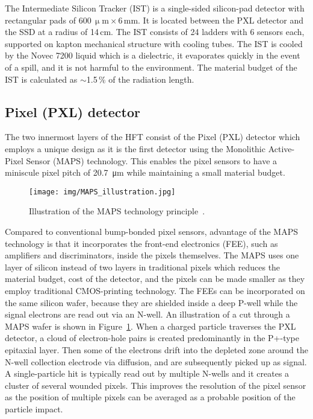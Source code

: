 The Intermediate Silicon Tracker (IST) is a single-sided silicon-pad detector with rectangular pads of $600\,\upmu\mathrm{m}\times6\,$mm. It is located between the PXL detector and the SSD at a radius of 14$\,$cm. The IST consists of 24 ladders with 6 sensors each, supported on kapton mechanical structure with cooling tubes. The IST is cooled by the Novec 7200 liquid which is a dielectric, it evaporates quickly in the event of a spill, and it is not harmful to the environment. The material budget of the IST is calculated as $\sim$1.5$\,\%$ of the radiation length.

\subsection{Pixel (PXL) detector}
The two innermost layers of the HFT consist of the Pixel (PXL) detector which employs a unique design as it is the
first detector using the Monolithic Active-Pixel Sensor (MAPS)
technology. This enables the pixel sensors to have a miniscule pixel pitch of \SI{20.7}{\micro\metre} while maintaining
a small material budget.

\begin{figure}[!htb]
\begin{center}
 \texttt{[image: img/MAPS\_illustration.jpg]}\\
\end{center}
\caption{\label{MAPS}Illustration of the MAPS technology principle~\cite{MAPS_illustration}.}
\end{figure}

Compared to conventional bump-bonded pixel sensors, advantage of the MAPS technology is that it incorporates the front-end electronics (FEE), such as amplifiers and discriminators, inside the pixels themselves. The MAPS uses one layer of silicon instead of two layers in traditional pixels which reduces the material budget, cost of the detector, and the pixels can be made smaller as they employ traditional CMOS-printing technology. The FEEs can be incorporated on the same silicon wafer, because they are shielded inside a deep P-well while the signal electrons are read out via an N-well. An illustration of a cut through a MAPS wafer is shown in Figure~\ref{MAPS}\@. When a charged particle traverses the PXL detector, a cloud of electron-hole pairs is created predominantly in the P+-type epitaxial layer. Then some of the electrons drift into the depleted zone around the N-well collection electrode via diffusion, and are subsequently picked up as signal. A single-particle hit is typically read out by multiple N-wells and it creates a cluster of several wounded pixels. This improves the resolution of the pixel sensor as the position of multiple pixels can be averaged as a probable position of the particle impact.

